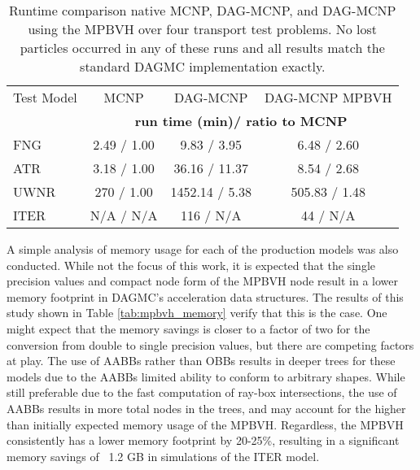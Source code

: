 \begin{table}[H]
  \small
  \begin{center}
    \begin{tabular}{lccc}

      \toprule
      Test Model & MCNP & DAG-MCNP & DAG-MCNP MPBVH \\
      & \multicolumn{3}{c}{\textbf{run time (min)/ ratio to MCNP}} \\
      \hline
      FNG  & 2.49 / 1.00 & 9.83  / 3.95    & 6.48 / 2.60   \\
      ATR  & 3.18 / 1.00 & 36.16 / 11.37   & 8.54 / 2.68   \\
      UWNR & 270  / 1.00 & 1452.14  / 5.38 & 505.83 / 1.48 \\
      ITER & N/A  / N/A  & 116   / N/A     & 44   / N/A    \\
      \bottomrule
    \end{tabular}
  \end{center}
  \caption[Performance comparison for production DAG-MCNP problems.]{Runtime
    comparison native MCNP, DAG-MCNP, and DAG-MCNP using the MPBVH over four
    transport test problems. No lost particles occurred in any of these runs and
    all results match the standard DAGMC implementation exactly.}
  \label{tab:mpbvh_transport_timing_production}
\end{table}

A simple analysis of memory usage for each of the production models was also
conducted. While not the focus of this work, it is expected that the
single precision values and compact node form of the MPBVH node result in a
lower memory footprint in DAGMC's acceleration data structures. The results of
this study shown in Table \ref{tab:mpbvh_memory} verify that this is the
case. One might expect that the memory savings is closer to a factor of two for
the conversion from double to single precision values, but there are competing
factors at play. The use of AABBs rather than OBBs results in
deeper trees for these models due to the AABBs limited ability to conform to
arbitrary shapes. While still preferable due to the fast computation of ray-box
intersections, the use of AABBs results in more total nodes in the trees, and
may account for the higher than initially expected memory usage of the MPBVH. Regardless,
the MPBVH consistently has a lower memory footprint by 20-25\%, resulting in a
significant memory savings of ~1.2 GB in simulations of the ITER model.

